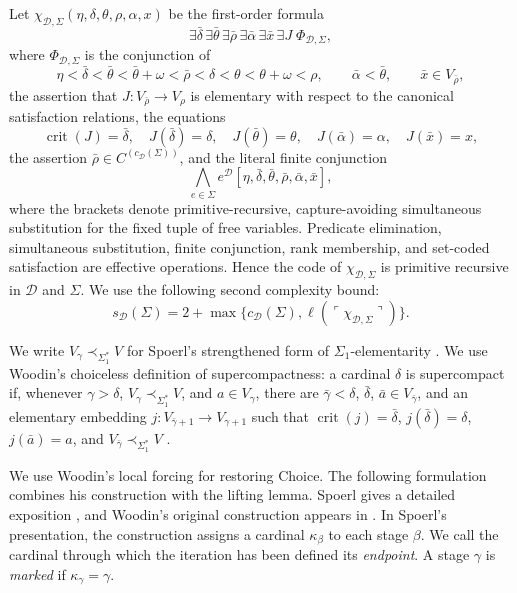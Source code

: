 \documentclass[11pt,a4paper]{amsart}
\newcommand{\crit}{\operatorname{crit}}
\theoremstyle{plain}
\theoremstyle{definition}
\theoremstyle{remark}
\begin{document}
Let $\chi_{\mathcal D,\Sigma}(\eta,\delta,\theta,\rho,\alpha,x)$ be the first-order formula
\[
\exists\bar\delta\,\exists\bar\theta\,\exists\bar\rho\,
\exists\bar\alpha\,\exists\bar x\,\exists J\;\Phi_{\mathcal D,\Sigma},
\]
where $\Phi_{\mathcal D,\Sigma}$ is the conjunction of
\[
\eta<\bar\delta<\bar\theta<\bar\theta+\omega<\bar\rho<
\delta<\theta<\theta+\omega<\rho,\qquad
\bar\alpha<\bar\theta,\qquad \bar x\in V_{\bar\rho},
\]
the assertion that $J:V_{\bar\rho}\to V_\rho$ is elementary with respect to the canonical satisfaction relations, the equations
\[
\crit(J)=\bar\delta,\quad J(\bar\delta)=\delta,\quad
J(\bar\theta)=\theta,\quad J(\bar\alpha)=\alpha,\quad J(\bar x)=x,
\]
the assertion $\bar\rho\in C^{(c_{\mathcal D}(\Sigma))}$, and the literal finite conjunction
\[
\bigwedge_{e\in\Sigma}
e^{\mathcal D}
[\eta,\bar\delta,\bar\theta,\bar\rho,\bar\alpha,\bar x],
\]
where the brackets denote primitive-recursive, capture-avoiding simultaneous substitution for the fixed tuple of free variables.  Predicate elimination, simultaneous substitution, finite conjunction, rank membership, and set-coded satisfaction are effective operations.  Hence the code of $\chi_{\mathcal D,\Sigma}$ is primitive recursive in $\mathcal D$ and $\Sigma$.  We use the following second complexity bound:
\[
s_{\mathcal D}(\Sigma)=2+\max\bigl\{c_{\mathcal D}(\Sigma),
\ell(\ulcorner\chi_{\mathcal D,\Sigma}\urcorner)\bigr\}.
\]
\endgroup

We write $V_\gamma\prec_{\Sigma_1^*}V$ for Spoerl's strengthened form of $\Sigma_1$-elementarity \cite[Definition~20]{Spoerl}.  We use Woodin's choiceless definition of supercompactness: a cardinal $\delta$ is supercompact if, whenever $\gamma>\delta$, $V_\gamma\prec_{\Sigma_1^*}V$, and $a\in V_\gamma$, there are $\bar\gamma<\delta$, $\bar\delta$, $\bar a\in V_{\bar\gamma}$, and an elementary embedding $j:V_{\bar\gamma+1}\to V_{\gamma+1}$ such that $\crit(j)=\bar\delta$, $j(\bar\delta)=\delta$, $j(\bar a)=a$, and $V_{\bar\gamma}\prec_{\Sigma_1^*}V$ \cite[Definition~21]{Spoerl}.

We use Woodin's local forcing for restoring Choice.  The following formulation combines his construction with the lifting lemma.  Spoerl gives a detailed exposition {\cite[Definition~43, Theorem~44(v), and Lemma~45]{Spoerl}}, and Woodin's original construction appears in \cite[pp.~323--324]{Woodin}.  In Spoerl's presentation, the construction assigns a cardinal $\kappa_\beta$ to each stage $\beta$.  We call the cardinal through which the iteration has been defined its \emph{endpoint}.  A stage $\gamma$ is \emph{marked} if $\kappa_\gamma=\gamma$.
\end{document}
